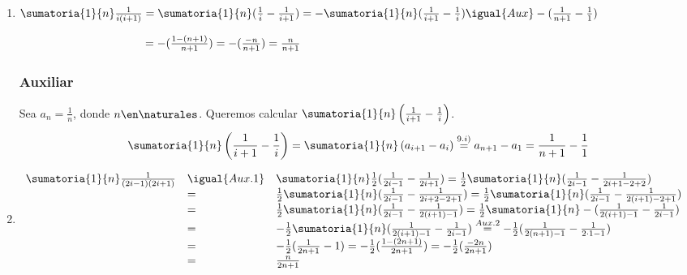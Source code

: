 \begin{enumerate}[label=\roman*)]
  \item $\sumatoria{1}{n} \frac{1}{i ( i + 1 )} =
        \sumatoria{1}{n} (\frac{1}{i}- \frac{1}{i+1}) =
        - \sumatoria{1}{n} (\frac{1}{i+1} - \frac{1}{i} ) \igual{Aux}
        - (\frac{1}{n+1}-\frac{1}{1}) \\$

        $ \text{\phantom{$ \sumatoria{1}{n} \frac{1}{i(i+1)}$}}  =
          - (\frac{1-(n+1)}{n+1}) = - (\frac{-n}{n+1}) = \frac{n}{n+1}$
        \subsubsection*{Auxiliar}
        Sea $ a_n = \frac{1}{n}$, donde $n \en \naturales $. Queremos calcular $ \sumatoria{1}{n} \left(\frac{1}{i+1} - \frac{1}{i}\right)$.
        \begin{align*}
          \sumatoria{1}{n} \left( \frac{1}{i+1} - \frac{1}{i}\right) =  \sumatoria{1}{n} \left(a_{i+1}- a_i \right) \overset{9.i)}{=} a_{n+1} - a_1 = \frac{1}{n+1} - \frac{1}{1}
        \end{align*}

  \item

        $\begin{array}{lll}
            \sumatoria{1}{n} \frac{1}{(2i-1)(2i+1)}
             & \igual{Aux.1}
             & \sumatoria{1}{n} \frac{1}{2} (\frac{1}{2i-1} - \frac{1}{2i+1} ) =
            \frac{1}{2} \sumatoria{1}{n} (\frac{1}{2i-1} - \frac{1}{2i+1-2+2} )                   \\
             & =                                                                 &
            \frac{1}{2} \sumatoria{1}{n} (\frac{1}{2i-1} - \frac{1}{2i+2-2+1} ) =
            \frac{1}{2} \sumatoria{1}{n} (\frac{1}{2i-1} - \frac{1}{2(i+1)-2+1} )                 \\
             & =                                                                 &
            \frac{1}{2} \sumatoria{1}{n} (\frac{1}{2i-1} - \frac{1}{2(i+1)-1} ) =
            \frac{1}{2} \sumatoria{1}{n} -(\frac{1}{2(i+1)-1} - \frac{1}{2i-1} )                  \\
             & =                                                                 &
            -\frac{1}{2} \sumatoria{1}{n} (\frac{1}{2(i+1)-1} - \frac{1}{2i-1} ) \overset{Aux.2}{=}
            -\frac{1}{2}(\frac{1}{2(n + 1)-1} -\frac{1}{2\cdot 1-1} )                             \\
             & =                                                                 &
            -\frac{1}{2}(\frac{1}{2n + 1} - 1 ) =
            -\frac{1}{2}(\frac{1-(2n + 1)}{2n + 1} ) =
            -\frac{1}{2}(\frac{-2n}{2n + 1} )                                                     \\
             & =                                                                 & \frac{n}{2n+1}
          \end{array}$


\end{enumerate}
